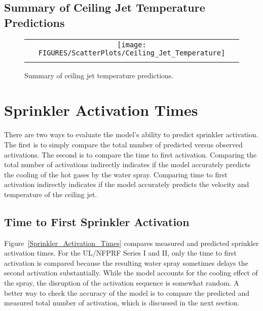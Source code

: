 \clearpage

\subsection{Summary of Ceiling Jet Temperature Predictions}

\begin{figure}[h!]
\begin{center}
\begin{tabular}{c}
\texttt{[image: FIGURES/ScatterPlots/Ceiling\_Jet\_Temperature]} \\
\vspace{0.25in}
\end{tabular}
\end{center}
\caption[Summary of ceiling jet temperature predictions.]
{Summary of ceiling jet temperature predictions.}
\end{figure}



\clearpage

\section{Sprinkler Activation Times}

There are two ways to evaluate the model's ability to predict sprinkler activation. The first is to simply compare the total number of predicted versus observed activations. The second is to compare the time to first activation. Comparing the total number of activations indirectly indicates if the model accurately predicts the cooling of the hot gases by the water spray. Comparing time to first activation indirectly indicates if the model accurately predicts the velocity and temperature of the ceiling jet.

\subsection{Time to First Sprinkler Activation}

Figure~\ref{Sprinkler_Activation_Times} compares measured and predicted sprinkler activation times. For the UL/NFPRF Series I and II, only the time to first activation is compared because the resulting water spray sometimes delays the second activation substantially. While the model accounts for the cooling effect of the spray, the disruption of the activation sequence is somewhat random. A better way to check the accuracy of the model is to compare the predicted and measured total number of activation, which is discussed in the next section.

